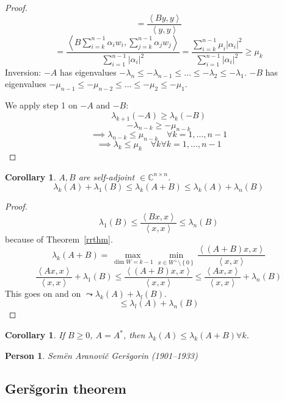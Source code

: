 \documentclass[a4paper]{article}
\newcounter{lecref}[section]
\numberwithin{lecref}{section}
\newtheorem{corollary}[lecref]{Corollary}
\newtheorem*{Person}{Person}
\newcommand{\set}[1]{\left\{#1\right\}}
\newcommand{\angel}[1]{\left\langle#1\right\rangle}
\newcommand{\card}[1]{\left|#1\right|}
\begin{document}
\begin{proof}
\[    = \frac{\angel{By, y}}{\angel{y, y}}
  \] \[
    = \frac{\angel{B \sum_{i=k}^{n-1} \alpha_i w_i, \sum_{j=k}^{n-1} \alpha_j w_j}}{\sum_{i=1}^{n-1} \card{\alpha_i}^2}
    = \frac{\sum_{i=k}^{n-1} \mu_i \card{\alpha_i}^2}{\sum_{i=1}^{n-1} \card{\alpha_i}^2} \geq \mu_k
  \]
  Inversion:
  $-A$ has eigenvalues $-\lambda_n \leq -\lambda_{n-1} \leq \dots \leq -\lambda_2 \leq -\lambda_1$.
  $-B$ has eigenvalues $-\mu_{n-1} \leq -\mu_{n-2} \leq \dots \leq -\mu_2 \leq -\mu_1$.

  We apply step 1 on $-A$ and $-B$:
  \[ \lambda_{k+1} (-A) \geq \lambda_k (-B) \]
  \[ -\lambda_{n-k} \geq -\mu_{n-k} \]
  \[ \implies \lambda_{n-k} \leq \mu_{n-k} \quad \forall k = 1, \dots, n-1 \]
  \[ \implies \lambda_k \leq \mu_k \quad \forall k \forall k = 1, \dots, n-1 \]
\end{proof}

\begin{corollary} %
  \label{col138}
  $A, B$ are self-adjoint $\in \mathbb C^{n \times n}$.
  \[ \lambda_{k}(A) + \lambda_1(B) \leq \lambda_k(A + B) \leq \lambda_k(A) + \lambda_n(B) \]
\end{corollary}
\begin{proof}
  \[ \lambda_1(B) \leq \frac{\angel{Bx, x}}{\angel{x, x}} \leq \lambda_n(B) \]
  because of Theorem~\ref{rrthm}.
  \[ \lambda_k(A + B) = \max_{\dim{W}=k-1} \min_{x \in W^\bot \setminus \set{0}} \frac{\angel{(A + B)x, x}}{\angel{x, x}} \]
  \[ \frac{\angel{Ax, x}}{\angel{x, x}} + \lambda_1(B) \leq \frac{\angel{(A + B)x, x}}{\angel{x, x}} \leq \frac{\angel{Ax, x}}{\angel{x, x}} + \lambda_n(B) \]
  This goes on and on $\leadsto \lambda_k(A) + \lambda_l(B)$.
  \[ \leq \lambda_l(A) + \lambda_n(B) \]
\end{proof}

\begin{corollary} %
  If $B \geq 0$, $A = A^*$, then $\lambda_k(A) \leq \lambda_k(A + B) \forall k$.
\end{corollary}

\begin{Person}
  Sem\"en Aranovi\v{c} Ger\v{s}gorin (1901--1933)
\end{Person}

\subsection{Ger\v{s}gorin theorem}
\end{document}
